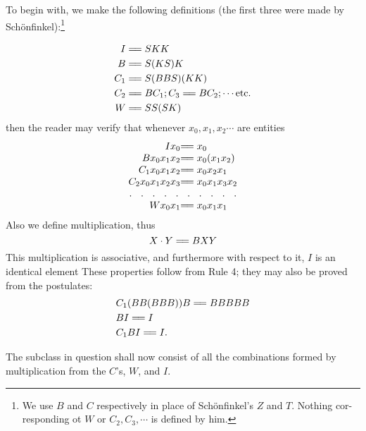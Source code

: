 \documentclass[10pt, twoside]{extarticle}
\newcommand\longeq{=\joinrel=}
\theoremstyle{breaktheorem}
\theoremstyle{mylemma}
\theoremstyle{mydefinition}
\theoremstyle{mycorollary}
\begin{document}
To begin with, we make the following definitions (the first three were made by Schönfinkel):\footnote{We use \(B\) and \(C\) respectively in place of Schönfinkel's \(Z\) and \(T\). Nothing cor- responding ot \(W\) or \(C_2, C_3, \cdots\) is defined by him.}

\begin{align*}
  I &\longeq SKK \\
  B &\longeq S(KS)K \\
  C_1 &\longeq S(BBS)(KK) \\
  C_2 &\longeq BC_1; C_3 \longeq BC_2; \cdots \text{etc.} \\
  W &\longeq SS(SK)
\end{align*}
then the reader may verify that whenever \(x_0, x_1, x_2 \cdots\) are entities
\begin{equation*}
  \renewcommand{\arraycolsep}{0pt}%
  \begin{array}{rl}
  Ix_0 &\longeq x_0 \\
  Bx_0x_1x_2 &\longeq x_0(x_1x_2) \\
  C_1x_0x_1x_2 &\longeq x_0x_2x_1 \\
  C_2x_0x_1x_2x_3 &\longeq x_0x_1x_3x_2 \\
  \hdotsfor[5]{2} \\
  Wx_0x_1 &\longeq x_0x_1x_1
  \end{array}
\end{equation*}
Also we define multiplication, thus
\[X\cdot Y \longeq BXY\]
This multiplication is associative, and furthermore with respect to it, \(I\) is an
identical element These properties follow from Rule 4; they may also be
proved from the postulates:
\begin{align*}
  &C_1(BB(BBB))B \longeq BBBBB \\
  &BI \longeq I \\
  &C_1BI \longeq I. \\
\end{align*}

The subclass in question shall now consist of all the combinations formed by multiplication from the \(C\)'s, \(W\), and \(I\).
\end{document}
